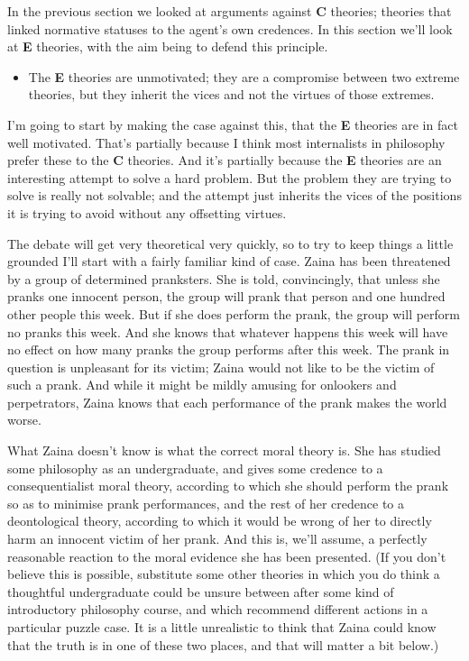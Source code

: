 \documentclass[
  10pt,
  letterpaper,
  twoside]{scrbook}
\providecommand{\tightlist}{%
  \setlength{\itemsep}{0pt}\setlength{\parskip}{0pt}}\usepackage{longtable,booktabs,array}
\begin{document}
In the previous section we looked at arguments against \textbf{C}
theories; theories that linked normative statuses to the agent's own
credences. In this section we'll look at \textbf{E} theories, with the
aim being to defend this principle.

\begin{itemize}
\tightlist
\item
  The \textbf{E} theories are unmotivated; they are a compromise between
  two extreme theories, but they inherit the vices and not the virtues
  of those extremes.
\end{itemize}

I'm going to start by making the case against this, that the \textbf{E}
theories are in fact well motivated. That's partially because I think
most internalists in philosophy prefer these to the \textbf{C} theories.
And it's partially because the \textbf{E} theories are an interesting
attempt to solve a hard problem. But the problem they are trying to
solve is really not solvable; and the attempt just inherits the vices of
the positions it is trying to avoid without any offsetting virtues.

The debate will get very theoretical very quickly, so to try to keep
things a little grounded I'll start with a fairly familiar kind of case.
{Zaina} has been threatened by a group of determined pranksters. She is
told, convincingly, that unless she pranks one innocent person, the
group will prank that person and one hundred other people this week. But
if she does perform the prank, the group will perform no pranks this
week. And she knows that whatever happens this week will have no effect
on how many pranks the group performs after this week. The prank in
question is unpleasant for its victim; {Zaina} would not like to be the
victim of such a prank. And while it might be mildly amusing for
onlookers and perpetrators, {Zaina} knows that each performance of the
prank makes the world worse.

What {Zaina} doesn't know is what the correct moral theory is. She has
studied some philosophy as an undergraduate, and gives some credence to
a consequentialist moral theory, according to which she should perform
the prank so as to minimise prank performances, and the rest of her
credence to a deontological theory, according to which it would be wrong
of her to directly harm an innocent victim of her prank. And this is,
we'll assume, a perfectly reasonable reaction to the moral evidence she
has been presented. (If you don't believe this is possible, substitute
some other theories in which you do think a thoughtful undergraduate
could be unsure between after some kind of introductory philosophy
course, and which recommend different actions in a particular puzzle
case. It is a little unrealistic to think that Zaina could know that the
truth is in one of these two places, and that will matter a bit below.)
\end{document}

